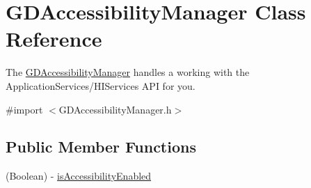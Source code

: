 \hypertarget{interface_g_d_accessibility_manager}{
\section{GDAccessibilityManager Class Reference}
\label{interface_g_d_accessibility_manager}
}


The \hyperlink{interface_g_d_accessibility_manager}{GDAccessibilityManager} handles a working with the ApplicationServices/‍HIServices API for you.  


{\ttfamily \#import $<$GDAccessibilityManager.h$>$}\subsection*{Public Member Functions}
\begin{DoxyCompactItemize}
\item 
\hypertarget{interface_g_d_accessibility_manager_aa1c15fda19a039bbcc89620f3291ae3e}{
(Boolean) -\/ \hyperlink{interface_g_d_accessibility_manager_aa1c15fda19a039bbcc89620f3291ae3e}{isAccessibilityEnabled}}
\label{interface_g_d_accessibility_manager_aa1c15fda19a039bbcc89620f3291ae3e}


\end{DoxyCompactItemize}
